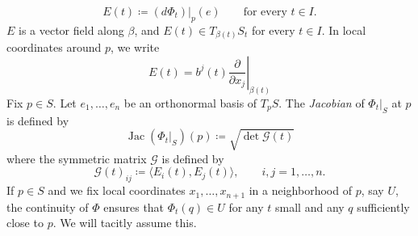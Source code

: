 \documentclass[11pt]{amsart}
\newcommand{\G}{\mathcal G}
\DeclareMathOperator{\jac}{Jac}
\theoremstyle{definition}
\theoremstyle{remark}
\numberwithin{equation}{section}
\begin{document}
    \begin{equation}\label{estensionevettore}
        E(t)\coloneqq\left(d\Phi_t\right)|_p(e)\qquad\text{for every $t\in I$.} 
    \end{equation}
    $E$ is a vector field along $\beta$, and $E(t)\in T_{\beta(t)}S_t$ for every $t\in I$. In local coordinates around $p$, we write
      \begin{equation*}
        E(t)=b^j(t)\left.\frac{\partial}{\partial x_j}\right|_{\beta(t)}
    \end{equation*}
    Fix $p\in S$. Let $e_1,\ldots,e_n$ be an orthonormal basis of $T_p S$. The \emph{Jacobian} of $\Phi_t|_{S}$ at $p$ is defined by
    \begin{equation*}
        \jac\left(\Phi_t|_{S}\right)\left(p\right)\coloneqq\sqrt{\det \G(t)}
    \end{equation*}
    where the symmetric matrix $\G$ is defined by
    \begin{equation}\label{grammatrix}
         \G(t)_{ij}\coloneqq\langle E_i(t),E_j(t)\rangle,\qquad i,j=1,\ldots,n.
    \end{equation}
    If $p\in S$ and we fix local coordinates $x_1,\ldots, x_{n+1}$ in a neighborhood of $p$, say $U$, the continuity of $\Phi$ ensures that $\Phi_t(q)\in U$ for any $t$ small and any $q$ sufficiently close to $p$. We will tacitly assume this. 
\end{document}
